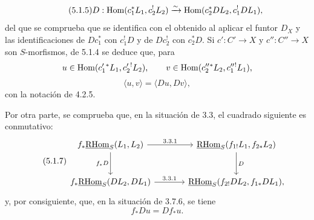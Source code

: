 \begin{equation}
\tag{5.1.5}
D:\operatorname{Hom}(c_1^*L_1,c_2^!L_2)\xrightarrow{\sim}\operatorname{Hom}(c_2^*DL_2,c_1^!DL_1),
\end{equation}
del que se comprueba que se identifica con el obtenido al aplicar el funtor $D_X$ y las identificaciones de $Dc_1^*$ con $c_1^!D$ y de $Dc_2^!$ con $c_2^*D$. Si $c':C'\to X$ y $c'':C''\to X$ son $S$-morfismos, de 5.1.4 se deduce que, para
\[
u\in\operatorname{Hom}(c_1'{}^*L_1,c_2'{}^!L_2),\qquad v\in\operatorname{Hom}(c_2''{}^*L_2,c_1''{}^!L_1),\]
\begin{equation}
\tag{5.1.6}
\langle u,v\rangle=\langle Du,Dv\rangle,
\end{equation}
con la notación de 4.2.5.

Por otra parte, se comprueba que, en la situación de 3.3, el cuadrado siguiente es conmutativo:
\begin{equation}
\tag{5.1.7}
\begin{tikzcd}[column sep=large,row sep=large]
f_*\uRHom_S(L_1,L_2) \arrow[r,"3.3.1"] \arrow[d,"f_*D"']
& \uRHom_S(f_{1!}L_1,f_{2*}L_2) \arrow[d,"D"] \\
f_*\uRHom_S(DL_2,DL_1) \arrow[r,"3.3.1"]
& \uRHom_S(f_{2!}DL_2,f_{1*}DL_1),
\end{tikzcd}
\end{equation}
y, por consiguiente, que, en la situación de 3.7.6, se tiene
\begin{equation}
\tag{5.1.8}
f_*Du=Df_*u.
\end{equation}

